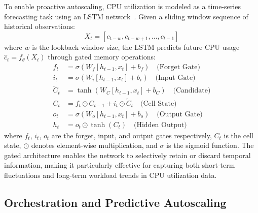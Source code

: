 \documentclass[a4paper,fleqn]{cas-dc}
\begin{document}
To enable proactive autoscaling, CPU utilization is modeled as a time-series forecasting task using an LSTM network~\citep{hochreiter1997lstm}.
Given a sliding window sequence of historical observations:
\begin{equation}
X_t = [c_{t-w}, c_{t-w+1}, \ldots, c_{t-1}]
\end{equation}
where $w$ is the lookback window size, the LSTM predicts future CPU usage $\hat{c}_t = f_{\theta}(X_t)$ through gated memory operations:
\begin{align}
f_t &= \sigma(W_f [h_{t-1}, x_t] + b_f) \quad \text{(Forget Gate)} \label{eq:forget}\\
i_t &= \sigma(W_i [h_{t-1}, x_t] + b_i) \quad \text{(Input Gate)} \label{eq:input}\\
\tilde{C}_t &= \tanh(W_C [h_{t-1}, x_t] + b_C) \quad \text{(Candidate)} \label{eq:candidate}\\
C_t &= f_t \odot C_{t-1} + i_t \odot \tilde{C}_t \quad \text{(Cell State)} \label{eq:cell}\\
o_t &= \sigma(W_o [h_{t-1}, x_t] + b_o) \quad \text{(Output Gate)} \label{eq:output}\\
h_t &= o_t \odot \tanh(C_t) \quad \text{(Hidden Output)} \label{eq:hidden}
\end{align}
where $f_t$, $i_t$, $o_t$ are the forget, input, and output
gates respectively, $C_t$ is the cell state, $\odot$ denotes element-wise multiplication, and $\sigma$ is the sigmoid function.
The gated architecture enables the network to selectively retain or discard temporal information, making it particularly effective for capturing both short-term fluctuations and long-term workload trends in CPU utilization data.

\subsection{Orchestration and Predictive Autoscaling}\label{subsec:orchestration}
\end{document}
